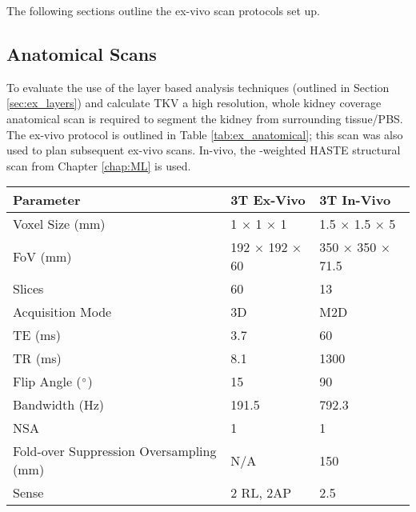 The following sections outline the ex-vivo scan protocols set up.
\subsection{Anatomical Scans}
\label{subsec:ex_anatomical_scans}
To evaluate the use of the layer based analysis techniques (outlined in Section \ref{sec:ex_layers}) and calculate \ac{TKV} a high resolution, whole kidney coverage anatomical scan is required to segment the kidney from surrounding tissue/\ac{PBS}. The ex-vivo protocol is outlined in Table \ref{tab:ex_anatomical}; this scan was also used to plan subsequent ex-vivo scans. In-vivo, the \ttwo-weighted \ac{HASTE} structural scan from Chapter \ref{chap:ML} is used.

\begin{table}[H]
	\centering
	\begin{tabularx}{1.0\textwidth}{X|X|X}
		\textbf{Parameter}                      & \textbf{3T Ex-Vivo} & \textbf{3T In-Vivo}      \\ \hline
		Voxel Size (mm)                         & 1 $\times$ 1 $\times$ 1           & 1.5 $\times$ 1.5 $\times$ 5            \\ \hline
		FoV (mm)                                & 192 $\times$ 192 $\times$ 60      & 350 $\times$ 350 $\times$ 71.5         \\ \hline
		Slices                                  & 60                  & 13                       \\ \hline
		Acquisition Mode                        & 3D                  & M2D                      \\ \hline
		TE (ms)                                 & 3.7                 & 60                       \\ \hline
		TR (ms)                                 & 8.1                 & 1300                     \\ \hline
		Flip Angle ($\degree$)                  & 15                  & 90                       \\ \hline
		Bandwidth (Hz)                          & 191.5               & 792.3                    \\ \hline
		NSA                                     & 1                   & 1                        \\ \hline
		Fold-over Suppression Oversampling (mm) & N/A                 & 150                      \\ \hline
		Sense                                   & 2 RL, 2AP           & 2.5                      \\ \hline

\end{tabularx}
\end{table}
